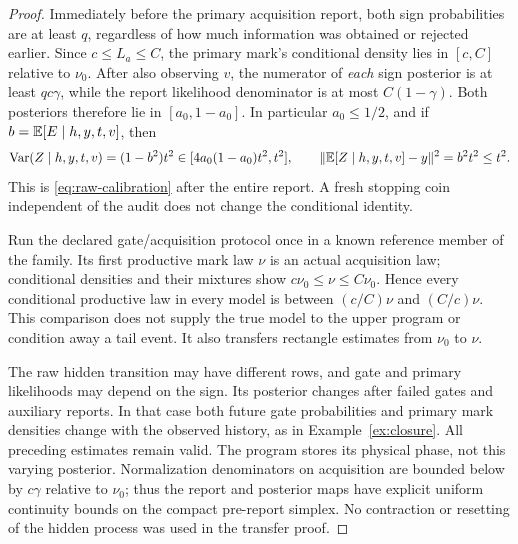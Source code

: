 \begin{proof}
Immediately before the primary acquisition report, both sign probabilities are at least $q$, regardless of how much information was obtained or rejected earlier. Since $c\le L_a\le C$, the primary mark's conditional density lies in $[c,C]$ relative to $\nu_0$. After also observing $v$, the numerator of \emph{each} sign posterior is at least $qc\gamma$, while the report likelihood denominator is at most $C(1-\gamma)$. Both posteriors therefore lie in $[a_0,1-a_0]$. In particular $a_0\le1/2$, and if $b=\mathbb E[E\mid h,y,t,v]$, then
\[
 \operatorname{Var}(Z\mid h,y,t,v)=(1-b^2)t^2
        \in[4a_0(1-a_0)t^2,t^2],\qquad
 \|\mathbb E[Z\mid h,y,t,v]-y\|^2=b^2t^2\le t^2.
\]
This is \eqref{eq:raw-calibration} after the entire report. A fresh stopping coin independent of the audit does not change the conditional identity.

Run the declared gate/acquisition protocol once in a known reference member of the family. Its first productive mark law $\nu$ is an actual acquisition law; conditional densities and their mixtures show $c\nu_0\le\nu\le C\nu_0$. Hence every conditional productive law in every model is between $(c/C)\nu$ and $(C/c)\nu$. This comparison does not supply the true model to the upper program or condition away a tail event. It also transfers rectangle estimates from $\nu_0$ to $\nu$.

The raw hidden transition may have different rows, and gate and primary likelihoods may depend on the sign. Its posterior changes after failed gates and auxiliary reports. In that case both future gate probabilities and primary mark densities change with the observed history, as in Example~\ref{ex:closure}. All preceding estimates remain valid. The program stores its physical phase, not this varying posterior. Normalization denominators on acquisition are bounded below by $c\gamma$ relative to $\nu_0$; thus the report and posterior maps have explicit uniform continuity bounds on the compact pre-report simplex. No contraction or resetting of the hidden process was used in the transfer proof.
\end{proof}

